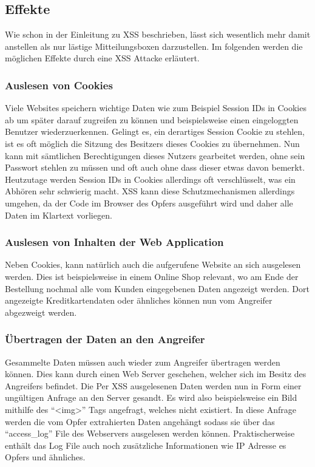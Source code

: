 \subsection{Effekte}
Wie schon in der Einleitung zu XSS beschrieben, l\"asst sich wesentlich mehr damit anstellen als nur l\"astige Mitteilungsboxen darzustellen. Im folgenden werden die m\"oglichen Effekte durch eine XSS Attacke erl\"autert.

\subsubsection{Auslesen von Cookies}
Viele Websites speichern wichtige Daten wie zum Beispiel Session IDs in Cookies ab um sp\"ater darauf zugreifen zu k\"onnen und beispielsweise einen eingeloggten Benutzer wiederzuerkennen. Gelingt es, ein derartiges Session Cookie zu stehlen, ist es oft m\"oglich die Sitzung des Besitzers dieses Cookies zu \"ubernehmen. Nun kann mit s\"amtlichen Berechtigungen dieses Nutzers gearbeitet werden, ohne sein Passwort stehlen zu m\"ussen und oft auch ohne dass dieser etwas davon bemerkt.\\
Heutzutage werden Session IDs in Cookies allerdings oft verschl\"usselt, was ein Abh\"oren sehr schwierig macht. XSS kann diese Schutzmechanismen allerdings umgehen, da der Code im Browser des Opfers ausgef\"uhrt wird und daher alle Daten im Klartext vorliegen.

\subsubsection{Auslesen von Inhalten der Web Application}
Neben Cookies, kann nat\"urlich auch die aufgerufene Website an sich ausgelesen werden. Dies ist beispielsweise in einem Online Shop relevant, wo am Ende der Bestellung nochmal alle vom Kunden eingegebenen Daten angezeigt werden. Dort angezeigte Kreditkartendaten oder \"ahnliches k\"onnen nun vom Angreifer abgezweigt werden.

\subsubsection{\"Ubertragen der Daten an den Angreifer}
Gesammelte Daten m\"ussen auch wieder zum Angreifer \"ubertragen werden k\"onnen. Dies kann durch einen Web Server geschehen, welcher sich im Besitz des Angreifers befindet. Die Per XSS ausgelesenen Daten werden nun in Form einer ung\"ultigen Anfrage an den Server gesandt. Es wird also beispielsweise ein Bild mithilfe des ``<img>'' Tags angefragt, welches nicht existiert. In diese Anfrage werden die vom Opfer extrahierten Daten angeh\"angt sodass sie \"uber das ``access\_log'' File des Webservers ausgelesen werden k\"onnen. Praktischerweise enth\"alt das Log File auch noch zus\"atzliche Informationen wie IP Adresse es Opfers und \"ahnliches.

